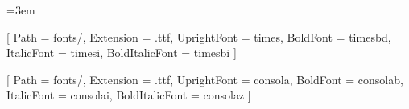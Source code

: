 \usepackage[a4paper, top=1.8cm, bottom=1.8cm, left=2.0cm, right=2.0cm]{geometry}
\usepackage{xcolor}
\usepackage{fancyhdr}
\usepackage{graphicx}
\usepackage{booktabs}
\usepackage{microtype}
\usepackage{parskip}
\usepackage{etoolbox}
\usepackage{amssymb}
\usepackage{pifont}
\usepackage{xurl}

\AtBeginDocument{
  \def\boxtimes{\textnormal{\textbf{[\,\ding{51}\,]}}}
}

\emergencystretch=3em

\setmainfont{Times New Roman}[
  Path = fonts/,
  Extension = .ttf,
  UprightFont = times,
  BoldFont = timesbd,
  ItalicFont = timesi,
  BoldItalicFont = timesbi
]

\setmonofont{Consolas}[
  Path = fonts/,
  Extension = .ttf,
  UprightFont = consola,
  BoldFont = consolab,
  ItalicFont = consolai,
  BoldItalicFont = consolaz
]

\setlength{\parskip}{3pt plus 1pt minus 1pt}

\pagestyle{fancy}
\fancyhf{}
\renewcommand{\headrulewidth}{0pt}
\fancyfoot[C]{\fontsize{10pt}{12pt}\selectfont\textbf{\thepage}}
\renewcommand{\footrulewidth}{0pt}

\renewcommand{\labelitemi}{\textbullet}
\renewcommand{\labelitemii}{\textbullet}
\renewcommand{\labelitemiii}{\textbullet}
\renewcommand{\labelitemiv}{\textbullet}


\makeatletter
\def\@seccntformat#1{}
\renewcommand\section{\@startsection{section}{1}{\z@}%
  {-1.6ex \@plus -0.5ex \@minus -.2ex}%
  {0.8ex \@plus.2ex}%
  {\normalfont\large\bfseries\color{black}}}
\renewcommand\subsection{\@startsection{subsection}{2}{\z@}%
  {-1.4ex \@plus -0.4ex \@minus -.2ex}%
  {0.6ex \@plus.2ex}%
  {\normalfont\normalsize\bfseries\color{black}}}
\renewcommand\subsubsection{\@startsection{subsubsection}{3}{\z@}%
  {-1.2ex \@plus -0.3ex \@minus -.2ex}%
  {0.5ex \@plus.2ex}%
  {\normalfont\normalsize\bfseries\color{black}}}
\makeatother


